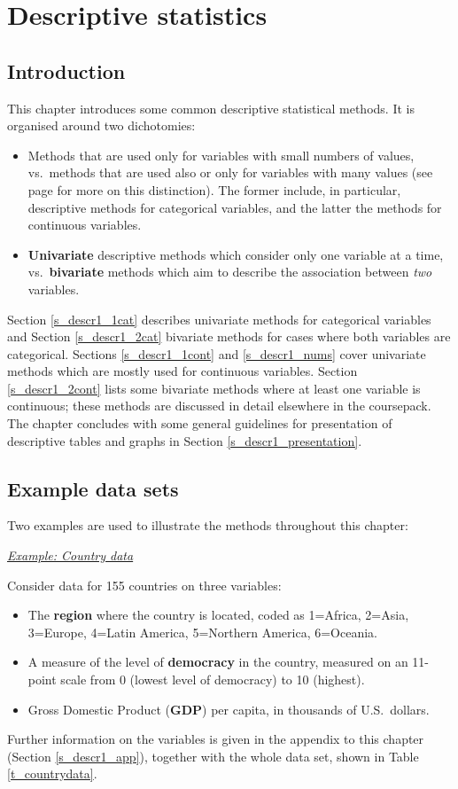 \chapter{Descriptive statistics} \label{c_descr1}

\section{Introduction}
\label{s_descr1_intro}

This chapter introduces some common descriptive statistical methods. It
is organised around two dichotomies:
\begin{itemize}
\item
Methods that are used only for variables with small numbers of values,
vs.\ methods that are used also or only for variables with many
values (see page \pageref{p_2_variable_types} for more on this
distinction). The former include, in particular, descriptive methods for
categorical variables, and the latter the methods for continuous
variables.
\item
\textbf{Univariate} descriptive methods which consider only one variable at a
time, vs.\ \textbf{bivariate} methods which aim to describe the association
between \emph{two} variables.
\end{itemize}
Section \ref{s_descr1_1cat} describes univariate methods for categorical
variables and Section \ref{s_descr1_2cat} bivariate methods for cases
where both variables are categorical. Sections \ref{s_descr1_1cont} and
\ref{s_descr1_nums} cover univariate methods which are mostly used for continuous
variables.
Section \ref{s_descr1_2cont} lists some bivariate
methods where at least one variable is continuous; these methods are
discussed in detail elsewhere in the coursepack.
The chapter concludes with some general guidelines
for presentation of descriptive tables and graphs in Section
\ref{s_descr1_presentation}.

\section{Example data sets}
\label{s_descr1_examples}

Two examples are used to illustrate the methods throughout this chapter:

\underline{\emph{Example: Country data}}\label{country_example}

Consider data for 155 countries on three
variables:
\begin{itemize}
\item
The \textbf{region} where the country is located,
coded as 1=Africa, 2=Asia, 3=Europe, 4=Latin America, 5=Northern
America, 6=Oceania.
\item
A measure of the level of \textbf{democracy} in the country, measured on
an 11-point scale from 0 (lowest level of democracy) to 10 (highest).
\item
Gross Domestic Product (\textbf{GDP})
per capita, in thousands of U.S.\ dollars.
\end{itemize}
Further information on the variables is given in the appendix to this
chapter (Section \ref{s_descr1_app}), together with the whole data set,
shown in Table \ref{t_countrydata}.

